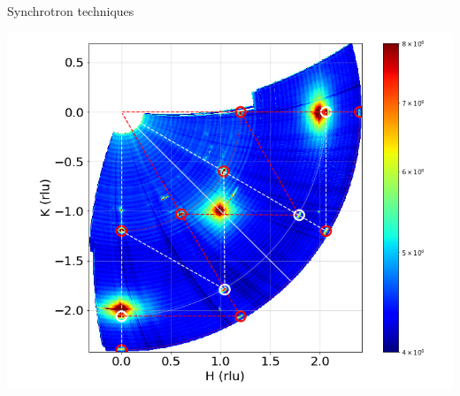 \begin{frame}{Synchrotron techniques}
\begin{center}
\hspace{-0.5cm}
    {\includegraphics[height=0.45\textheight]{Figures/sxrd_data/maps/Map_hkl_surf_or_2227-2283.png}}

\end{center}
\end{frame}
